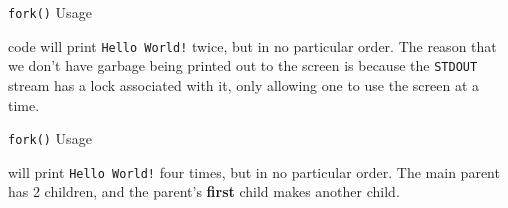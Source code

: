 \begin{listing}[h!tbp]
\caption{\texttt{fork()} Usage}
\label{lst:fork_Usage-1}
\end{listing}

 code will print \texttt{Hello World!} twice, but in no particular order.
The reason that we don't have garbage being printed out to the screen is because the \texttt{STDOUT} stream has a lock associated with it, only allowing one  to use the screen at a time.

\begin{listing}[h!tbp]
\caption{\texttt{fork()} Usage}
\label{lst:fork_Usage-2}
\end{listing}

 will print \texttt{Hello World!} four times, but in no particular order.
The main parent  has 2 children, and the parent's \textbf{first} child makes another child.


